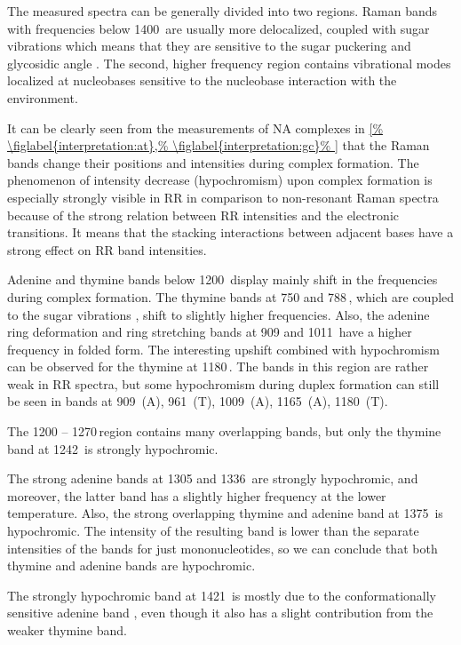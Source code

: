 The measured spectra can be generally divided into two regions. Raman bands
with frequencies below 1400\,\icm{} are usually more delocalized, coupled with
sugar vibrations which means that they are sensitive to the sugar puckering
and glycosidic angle
\parencite{%
	Benevides2005,%
	Nishimura1986b%
}.
The second, higher frequency region contains vibrational modes localized at
nucleobases sensitive to the nucleobase interaction with the environment.

It can be clearly seen from the measurements of NA complexes in
\cref{%
	\figlabel{interpretation:at},%
	\figlabel{interpretation:gc}%
}
that the Raman bands change their positions and intensities during complex
formation. The phenomenon of intensity decrease
(hypochromism) upon complex formation is especially strongly visible in
RR in comparison to non-resonant Raman spectra because of the strong relation
between RR intensities and the electronic transitions. It means that the
stacking interactions between adjacent bases have a strong effect on RR band
intensities.

Adenine and thymine bands below 1200\,\icm{} display mainly shift in the
frequencies during complex formation. The thymine bands at 750 and 788\,\icm{},
which are coupled to the sugar vibrations
\parencite{Zhu2008},
shift to slightly higher frequencies.
Also, the adenine ring deformation and ring stretching bands at 909 and
1011\,\icm{}
\parencite{Xue2000}
have a higher frequency in folded form.
The interesting upshift combined with hypochromism can be observed for the
thymine at 1180\,\icm{}.
The bands in this region are rather weak in RR spectra, but some
hypochromism during duplex formation can still be seen in bands at
	909\,\icm{} (A),
	961\,\icm{} (T),
	1009\,\icm{} (A),
	1165\,\icm{} (A),
	1180\,\icm{} (T).

The 1200 -- 1270\,\icm region contains many overlapping bands, but only the
thymine band at 1242\,\icm{} is strongly hypochromic.

The strong adenine bands at 1305 and 1336\,\icm{} are strongly hypochromic, and
moreover, the latter band has a slightly higher frequency at the lower
temperature.
Also, the strong overlapping thymine and adenine band at 1375\,\icm{} is
hypochromic. The intensity of the resulting band is lower than the separate
intensities of the bands for just mononucleotides, so we can conclude that
both thymine and adenine bands are hypochromic.

The strongly hypochromic band at 1421\,\icm{} is mostly due to the
conformationally sensitive adenine band
\parencite{%
	Tomkova1994,%
	Taillandier1989,%
},
even though it also has a slight contribution from the weaker thymine band.

